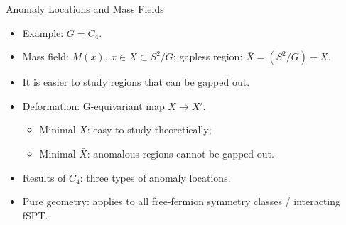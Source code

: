 \documentclass[xcolor=table, 11pt, aspectratio=169]{beamer}
\begin{document}
  \begin{frame}{Anomaly Locations and Mass Fields}
    \begin{itemize}
      \item<1-> Example: $G=C_4$.
      \item<2-> Mass field: $M(x)$, $x\in X\subset S^2/G$; gapless region: $\bar X=(S^2/G) - X$.
      \item<2-> It is easier to study regions that can be gapped out.
      \item<3-> Deformation: G-equivariant map $X\rightarrow X'$.
      \begin{itemize}
        \item<3-> Minimal $X$: easy to study theoretically;
        \item<3-> Minimal $\bar X$: anomalous regions cannot be gapped out.
      \end{itemize}
      \item<4-> Results of $C_4$: three types of anomaly locations.
      \item<5-> Pure geometry: applies to all free-fermion symmetry classes / interacting fSPT.
    \end{itemize}
    \begin{center}
      \hspace{2em}
      \begin{animateinline}{30}
      \end{animateinline}
      \hspace{4em}
      \begin{tikzpicture}[scale=1.2]

\end{tikzpicture}
\end{center}
\end{frame}
\end{document}

